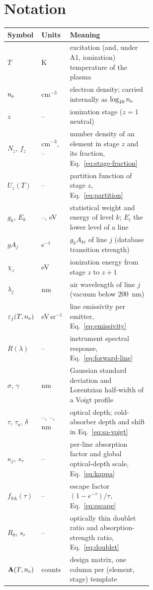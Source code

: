 \section{Notation}
\label{app:notation}

\begin{table}[h]
\centering
\small
\begin{tabular}{@{}llp{0.58\linewidth}@{}}
\toprule
Symbol & Units & Meaning \\
\midrule
$T$ & K & excitation (and, under A1, ionization) temperature of the plasma \\
$n_{\mathrm{e}}$ & cm$^{-3}$ & electron density; carried internally as $\log_{10}n_{\mathrm{e}}$ \\
$z$ & -- & ionization stage ($z=1$ neutral) \\
$N_z$, $f_z$ & cm$^{-3}$, -- & number density of an element in stage $z$ and its fraction, Eq.~\eqref{eq:stage-fraction} \\
$U_z(T)$ & -- & partition function of stage $z$, Eq.~\eqref{eq:partition} \\
$g_k$, $E_k$ & --, eV & statistical weight and energy of level $k$; $E_i$ the lower level of a line \\
$gA_j$ & s$^{-1}$ & $g_kA_{ki}$ of line $j$ (database transition strength) \\
$\chi_z$ & eV & ionization energy from stage $z$ to $z+1$ \\
$\lambda_j$ & nm & air wavelength of line $j$ (vacuum below \SI{200}{\nano\meter}) \\
$\varepsilon_j(T,n_{\mathrm{e}})$ & eV\,sr$^{-1}$ & line emissivity per emitter, Eq.~\eqref{eq:emissivity} \\
$R(\lambda)$ & -- & instrument spectral response, Eq.~\eqref{eq:forward-line} \\
$\sigma$, $\gamma$ & nm & Gaussian standard deviation and Lorentzian half-width of a Voigt profile \\
$\tau$, $\tau_a$, $\delta$ & --, --, nm & optical depth; cold-absorber depth and shift in Eq.~\eqref{eq:sa-voigt} \\
$\kappa_j$, $s_\tau$ & -- & per-line absorption factor and global optical-depth scale, Eq.~\eqref{eq:kappa} \\
$f_\mathrm{SA}(\tau)$ & -- & escape factor $(1-e^{-\tau})/\tau$, Eq.~\eqref{eq:escape} \\
$R_0$, $s_r$ & -- & optically thin doublet ratio and absorption-strength ratio, Eq.~\eqref{eq:doublet} \\
$\mathbf{A}(T,n_{\mathrm{e}})$ & counts & design matrix, one column per (element, stage) template \\

\end{tabular}
\end{table}
